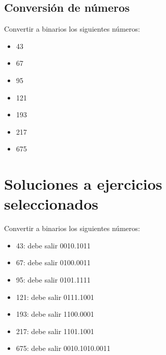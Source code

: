 \documentclass[letterpaper,10pt,spanish]{sphinxmanual}
\begin{document}
\section{Conversión de números}
\label{\detokenize{anexos/t1_ejercicios:conversion-de-numeros}}
Convertir a binarios los siguientes números:
\begin{itemize}
\item {} 
43

\item {} 
67

\item {} 
95

\item {} 
121

\item {} 
193

\item {} 
217

\item {} 
675

\end{itemize}


\chapter{Soluciones a ejercicios seleccionados}
\label{\detokenize{anexos/t1_ejercicios:soluciones-a-ejercicios-seleccionados}}
Convertir a binarios los siguientes números:
\begin{itemize}
\item {} 
43: debe salir 0010.1011

\item {} 
67: debe salir 0100.0011

\item {} 
95: debe salir 0101.1111

\item {} 
121: debe salir 0111.1001

\item {} 
193: debe salir 1100.0001

\item {} 
217: debe salir 1101.1001

\item {} 
675: debe salir 0010.1010.0011

\end{itemize}



\renewcommand{\indexname}{Índice}
\printindex
\end{document}
